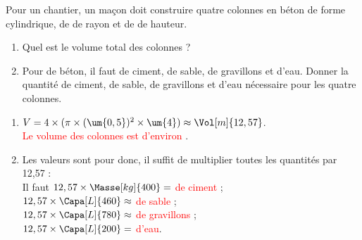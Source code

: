 \begin{exercice*} %
   Pour un chantier, un maçon doit construire quatre colonnes en béton de forme cylindrique, de  de rayon et de  de hauteur.
   \begin{enumerate}
      \item Quel est le volume total des colonnes ?
      \item Pour  de béton, il faut  de ciment,  de sable,  de gravillons et  d'eau.
         Donner la quantité de ciment, de sable, de gravillons et d'eau nécessaire pour les quatre colonnes.
   \end{enumerate}
\end{exercice*}

\begin{corrige}
   \begin{enumerate}
      \item $V =4\times(\pi\times(\um{0,5})^2\times\um{4}) \approx \Vol[m]{12,57}$. \\
         \textcolor{red}{Le volume des colonnes est d'environ }.
      \item Les valeurs sont pour  donc, il suffit de multiplier toutes les quantités par 12,57 : \\
         Il faut $12,57\times\Masse[kg]{400} =$ \textcolor{red}{ de ciment} ; \\
         $12,57\times\Capa[L]{460} \approx$ \textcolor{red}{ de sable} ; \\
         $12,57\times\Capa[L]{780} \approx$ \textcolor{red}{ de gravillons} ; \\
         $12,57\times\Capa[L]{200} =$ \textcolor{red}{ d'eau}.
   \end{enumerate}
\end{corrige}
